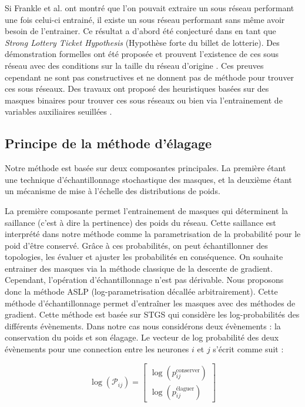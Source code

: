 Si Frankle et al. ont montré que l'on pouvait extraire un sous réseau performant
une fois celui-ci entrainé, il existe un sous réseau performant sans même avoir
besoin de l'entrainer. Ce résultat a d'abord été conjecturé dans
\cite{DBLP:conf/cvpr/RamanujanWKFR20} en tant que \emph{Strong Lottery Ticket
Hypothesis} (Hypothèse forte du billet de lotterie). Des démonstration formelles
ont été proposée et prouvent l'existence de ces sous réseau avec des conditions
sur la taille du réseau d'origine
\cite{DBLP:conf/icml/MalachYSS20,DBLP:conf/nips/OrseauHR20,DBLP:conf/nips/PensiaRNVP20}.
Ces preuves cependant ne sont pas constructives et ne donnent pas de méthode
pour trouver ces sous réseaux. Des travaux ont proposé des heuristiques basées
sur des masques binaires pour trouver ces sous réseaux
\cite{DBLP:conf/nips/ZhouLLY19} ou bien via l'entrainement de variables
auxiliaires seuillées \cite{DBLP:conf/cvpr/RamanujanWKFR20}.



\subsection*{Principe de la méthode d'élagage}

Notre méthode est basée sur deux composantes principales. La première étant une
technique d'échantillonnage stochastique des masques, et la deuxième étant un
mécanisme de mise à l'échelle des distributions de poids. 

La première composante permet l'entrainement de masques qui déterminent la
saillance (c'est à dire la pertinence) des poids du réseau. Cette saillance est
interprété dans notre méthode comme la parametrisation de la probabilité pour le
poid d'être conservé. Grâce à ces probabilités, on peut échantillonner des
topologies, les évaluer et ajuster les probabilités en conséquence. On souhaite
entrainer des masques via la méthode classique de la descente de gradient.
Cependant, l'opération d'échantillonnage n'est pas dérivable. Nous proposons
donc la méthode \ac{ASLP} (log-parametrisation décallée arbitrairement). Cette
méthode d'échantillonnage permet d'entraîner les masques avec des méthodes de
gradient. Cette méthode est basée sur \ac{STGS} qui considère les
log-probabilités des différents évènements. Dans notre cas nous considérons deux
évènements : la conservation du poids et son élagage. Le vecteur de log
probabilité des deux évènements pour une connection entre les neurones $i$ et
$j$ s'écrit comme suit :

\begin{equation}
  \label{eqn:chap2:log_prob}
  \log(\mathcal{P}_{ij}) = \begin{bmatrix}
    \log(p^\text{conserver}_{ij}) \\
    \log(p^\text{élaguer}_{ij})
  \end{bmatrix}
\end{equation}

